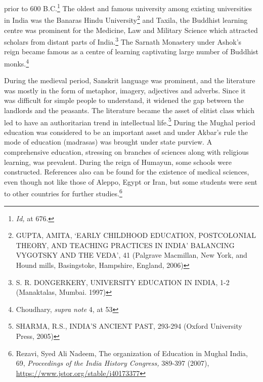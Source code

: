 \begin{multicols}{2}
prior to 600 B.C.\footnote{\textit{Id,} at 676.} The oldest and famous university among existing universities in India was
the Banaras Hindu University\footnote{GUPTA, AMITA, ‘EARLY CHILDHOOD EDUCATION, POSTCOLONIAL THEORY, AND TEACHING PRACTICES IN INDIA’ BALANCING VYGOTSKY AND THE VEDA’, 41 (Palgrave Macmillan, New York, and Hound mills, Basingstoke, Hampshire, England, 2006)} and Taxila, the Buddhist learning centre was prominent for the
Medicine, Law and Military Science which attracted scholars from distant parts of India.\footnote{S. R. DONGERKERY, UNIVERSITY EDUCATION IN INDIA, 1-2 (Manaktalas, Mumbai. 1997)}
The Sarnath Monastery under Ashok’s reign became famous as a centre of learning
captivating large number of Buddhist monks.\footnote{Choudhary, \textit{supra note} 4, at 53}

\vspace{-.2cm}

\noi
During the medieval period, Sanskrit language was prominent, and the literature was mostly
in the form of metaphor, imagery, adjectives and adverbs. Since it was difficult for simple
people to understand, it widened the gap between the landlords and the peasants. The
literature became the asset of elitist class which led to have an authoritarian trend in intellectual life.\footnote{SHARMA, R.S., INDIA’S ANCIENT PAST, 293-294 (Oxford University Press, 2005)} During the Mughal period education was considered to be an important
asset and under Akbar’s rule the mode of education (madrasas) was brought under state
purview. A comprehensive education, stressing on branches of sciences along with religious
learning, was prevalent. During the reign of Humayun, some schools were constructed.
References also can be found for the existence of medical sciences, even though not like
those of Aleppo, Egypt or Iran, but some students were sent to other countries for further
studies.\footnote{Rezavi, Syed Ali Nadeem, The organization of Education in Mughal India, 69, \textit{Proceedings of the India History Congress,} 389-397 (2007), \url{https://www.jstor.org/stable/i40173377}}


\end{multicols}
